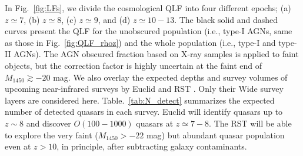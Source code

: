 \documentclass[twocolumn, twocolappendix]{aastex63}
\newcommand{\Muv}{M_{1450}}
\begin{document}
\begin{CJK*}{UTF8}{gbsn}
In Fig.~\ref{fig:LFs}, we divide the cosmological QLF into four different epochs; (a) $z\simeq 7$, (b) $z\simeq 8$, (c) $z\simeq 9$, and (d) $z\simeq 10-13$.
The black solid and dashed curves present the QLF for the unobscured population (i.e., type-I AGNs, same as those in Fig.~\ref{fig:QLF_rhoz})
and the whole population (i.e., type-I and type-II AGNs).
The AGN obscured fraction based on X-ray samples \citep{2014ApJ...786..104U} is applied to faint objects, 
but the correction factor is highly uncertain at the faint end of $\Muv\gtrsim -20$ mag.
We also overlay the expected depths and survey volumes of upcoming near-infrared surveys by
Euclid \citep{2011arXiv1110.3193L} and RST \citep{2019arXiv190205569A}.
Only their Wide survey layers are considered here.
Table.~\ref{tab:N_detect} summarizes the expected number of detected quasars in each survey. 
Euclid will identify quasars up to $z\sim 8$ and discover $O(100-1000)$ quasars at $z\simeq 7-8$.
The RST will be able to explore the very faint ($\Muv>-22$ mag) but abundant quasar population even at $z>10$, in principle,
after subtracting galaxy contaminants.





\end{CJK*}
\end{document}
